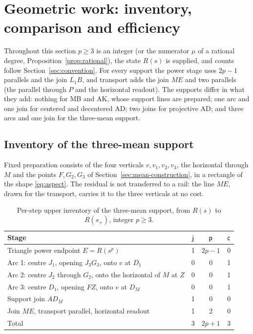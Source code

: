 \section{Geometric work: inventory, comparison and efficiency}\label{sec:work}

Throughout this section $p\ge3$ is an integer (or the numerator $\mu$ of a rational degree,
Proposition~\ref{prop:rational}), the state $R(s)$ is supplied, and counts follow
Section~\ref{sec:convention}. For every support the power stage uses $2p-1$ parallels and the join
$L_1B$, and transport adds the join $ME$ and two parallels (the parallel through $P$ and the horizontal
readout). The supports differ in what they add: nothing for MB and AK, whose support lines are
prepared; one arc and one join for centered and decentered AD; two joins for projective AD; and three
arcs and one join for the three-mean support.

\subsection{Inventory of the three-mean support}

Fixed preparation consists of the four verticals $v,v_1,v_2,v_3$, the horizontal through $M$ and the
points $F,G_2,G_3$ of Section~\ref{sec:mean-construction}, in a rectangle of the shape
\eqref{eq:aspect}. The residual is not transferred to a rail: the line $ME$, drawn for the transport,
carries it to the three verticals at no cost.

\begin{table}[htbp]
\centering\small
\caption{Per-step upper inventory of the three-mean support, from $R(s)$ to $R(s_+)$, integer
$p\ge3$.}\label{tab:mean-inventory}
\begin{tabular}{@{}lccc@{}}
\toprule
Stage & $\mathsf{j}$ & $\mathsf{p}$ & $\mathsf{c}$\\
\midrule
Triangle power endpoint $E=R(s^{p})$ & 1 & $2p-1$ & 0\\
Arc 1: centre $J_1$, opening $J_3G_3$, onto $v$ at $D_1$ & 0 & 0 & 1\\
Arc 2: centre $J_2$ through $G_2$, onto the horizontal of $M$ at $Z$ & 0 & 0 & 1\\
Arc 3: centre $D_1$, opening $FZ$, onto $v$ at $D_M$ & 0 & 0 & 1\\
Support join $AD_M$ & 1 & 0 & 0\\
Join $ME$, transport parallel, horizontal readout & 1 & 2 & 0\\
\midrule
Total & 3 & $2p+1$ & 3\\
\bottomrule
\end{tabular}
\end{table}

